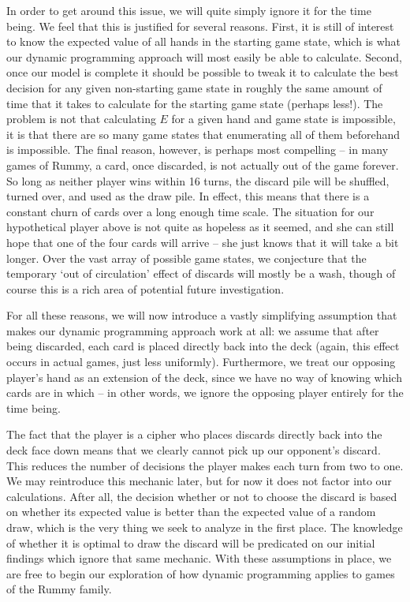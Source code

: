 \documentclass[letter,12pt]{article}
\begin{document}
In order to get around this issue, we will quite simply ignore it for the time being. We feel that this is justified for several reasons. First, it is still of interest to know the expected value of all hands in the starting game state, which is what our dynamic programming approach will most easily be able to calculate. Second, once our model is complete it should be possible to tweak it to calculate the best decision for any given non-starting game state in roughly the same amount of time that it takes to calculate for the starting game state (perhaps less!). The problem is not that calculating $E$ for a given hand and game state is impossible, it is that there are so many game states that enumerating all of them beforehand is impossible. The final reason, however, is perhaps most compelling – in many games of Rummy, a card, once discarded, is not actually out of the game forever. So long as neither player wins within 16 turns, the discard pile will be shuffled, turned over, and used as the draw pile. In effect, this means that there is a constant churn of cards over a long enough time scale. The situation for our hypothetical player above is not quite as hopeless as it seemed, and she can still hope that one of the four cards will arrive – she just knows that it will take a bit longer. Over the vast array of possible game states, we conjecture that the temporary ‘out of circulation’ effect of discards will mostly be a wash, though of course this is a rich area of potential future investigation. 

For all these reasons, we will now introduce a vastly simplifying assumption that makes our dynamic programming approach work at all: we assume that after being discarded, each card is placed directly back into the deck (again, this effect occurs in actual games, just less uniformly). Furthermore, we treat our opposing player's hand as an extension of the deck, since we have no way of knowing which cards are in which – in other words, we ignore the opposing player entirely for the time being.  

The fact that the player is a cipher who places discards directly back into the deck face down means that we clearly cannot pick up our opponent's discard. This reduces the number of decisions the player makes each turn from two to one. We may reintroduce this mechanic later, but for now it does not factor into our calculations. After all, the decision whether or not to choose the discard is based on whether its expected value is better than the expected value of a random draw, which is the very thing we seek to analyze in the first place. The knowledge of whether it is optimal to draw the discard will be predicated on our initial findings which ignore that same mechanic. With these assumptions in place, we are free to begin our exploration of how dynamic programming applies to games of the Rummy family.
\end{document}

